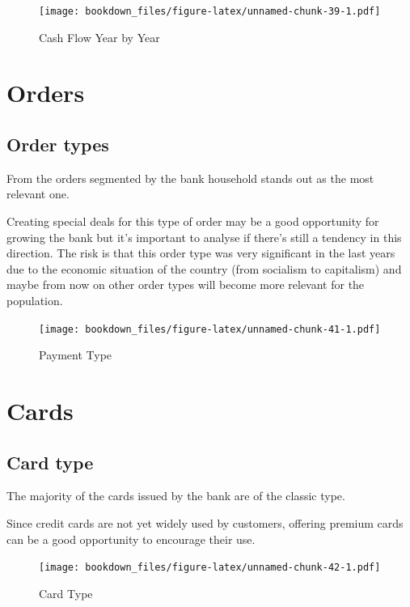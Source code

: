 \documentclass[]{book}
\begin{document}
\begin{figure}
\centering
\texttt{[image: bookdown\_files/figure-latex/unnamed-chunk-39-1.pdf]}
\caption{\label{fig:unnamed-chunk-39}Cash Flow Year by Year}
\end{figure}

\chapter{Orders}\label{orders}

\section{Order types}\label{order-types}

From the orders segmented by the bank household stands out as the most
relevant one.

Creating special deals for this type of order may be a good opportunity
for growing the bank but it's important to analyse if there's still a
tendency in this direction. The risk is that this order type was very
significant in the last years due to the economic situation of the
country (from socialism to capitalism) and maybe from now on other order
types will become more relevant for the population.

\begin{figure}
\centering
\texttt{[image: bookdown\_files/figure-latex/unnamed-chunk-41-1.pdf]}
\caption{\label{fig:unnamed-chunk-41}Payment Type}
\end{figure}

\chapter{Cards}\label{cards}

\section{Card type}\label{card-type}

The majority of the cards issued by the bank are of the classic type.

Since credit cards are not yet widely used by customers, offering
premium cards can be a good opportunity to encourage their use.

\begin{figure}
\centering
\texttt{[image: bookdown\_files/figure-latex/unnamed-chunk-42-1.pdf]}
\caption{\label{fig:unnamed-chunk-42}Card Type}
\end{figure}
\end{document}
